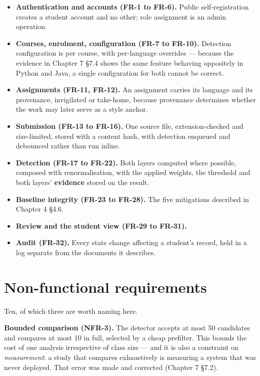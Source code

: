 \begin{itemize}
\tightlist
\item
  \textbf{Authentication and accounts (FR-1 to FR-6).} Public
  self-registration creates a student account and no other; role
  assignment is an admin operation.
\item
  \textbf{Courses, enrolment, configuration (FR-7 to FR-10).} Detection
  configuration is per course, with per-language overrides --- because
  the evidence in Chapter 7 \S{}7.4 shows the same feature behaving
  oppositely in Python and Java, a single configuration for both cannot
  be correct.
\item
  \textbf{Assignments (FR-11, FR-12).} An assignment carries its
  language and its provenance, invigilated or take-home, because
  provenance determines whether the work may later serve as a style
  anchor.
\item
  \textbf{Submission (FR-13 to FR-16).} One source file,
  extension-checked and size-limited, stored with a content hash, with
  detection enqueued and debounced rather than run inline.
\item
  \textbf{Detection (FR-17 to FR-22).} Both layers computed where
  possible, composed with renormalisation, with the applied weights, the
  threshold and both layers' \textbf{evidence} stored on the result.
\item
  \textbf{Baseline integrity (FR-23 to FR-28).} The five mitigations
  described in Chapter 4 \S{}4.6.
\item
  \textbf{Review and the student view (FR-29 to FR-31).}
\item
  \textbf{Audit (FR-32).} Every state change affecting a student's
  record, held in a log separate from the documents it describes.
\end{itemize}

\hypertarget{non-functional-requirements}{%
\section{Non-functional
requirements}\label{non-functional-requirements}}

Ten, of which three are worth naming here.

\textbf{Bounded comparison (NFR-3).} The detector accepts at most 50
candidates and compares at most 10 in full, selected by a cheap
prefilter. This bounds the cost of one analysis irrespective of class
size --- and it is also a constraint on \emph{measurement}: a study that
compares exhaustively is measuring a system that was never deployed.
That error was made and corrected (Chapter 7 \S{}7.2).

